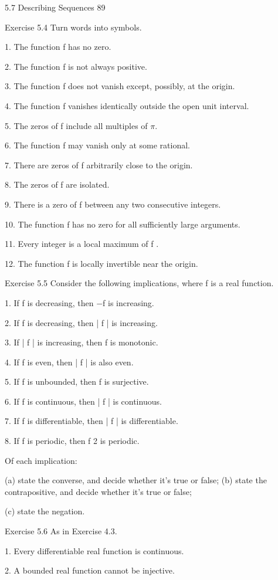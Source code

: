 \documentclass[11pt]{article}
\theoremstyle{plain}
\theoremstyle{definition}
\begin{document}
5.7 Describing Sequences 89

Exercise 5.4 Turn words into symbols.

1. The function f has no zero.

2. The function f is not always positive.

3. The function f does not vanish except, possibly, at the origin.

4. The function f vanishes identically outside the open unit interval.

5. The zeros of f include all multiples of $\pi$.

6. The function f may vanish only at some rational.

7. There are zeros of f arbitrarily close to the origin.

8. The zeros of f are isolated.

9. There is a zero of f between any two consecutive integers.

10. The function f has no zero for all sufficiently large arguments.

11. Every integer is a local maximum of f .

12. The function f is locally invertible near the origin.

Exercise 5.5 Consider the following implications, where f is a real function.

1. If f is decreasing, then $-$f is increasing.

2. If f is decreasing, then | f | is increasing.

3. If | f | is increasing, then f is monotonic.

4. If f is even, then | f | is also even.

5. If f is unbounded, then f is surjective.

6. If f is continuous, then | f | is continuous.

7. If f is differentiable, then | f | is differentiable.

8. If f is periodic, then f 2 is periodic.

Of each implication:

(a) state the converse, and decide whether it's true or false; (b) state the contrapositive, and decide whether it's true or false;

(c) state the negation.

Exercise 5.6 As in Exercise 4.3.

1. Every differentiable real function is continuous.

2. A bounded real function cannot be injective.
\end{document}
